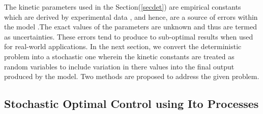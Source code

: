 \documentclass[3p,times,authoryear]{elsarticle}
\begin{document}
The kinetic parameters used in the Section(\ref{secdet}) are empirical constants which are derived by experimental data \cite{hu,shi,paeng}, and hence, are a source of errors within the model .The exact values of the parameters are unknown and thus are termed as uncertainties. These errors tend to produce to sub-optimal results when used for real-world applications. In the next section, we convert the deterministic problem into a stochastic one wherein the kinetic constants are treated as random variables to include variation in there values into the final output produced by the model. Two methods are proposed to address the given problem. 

\subsection{Stochastic Optimal Control using Ito Processes}
\end{document}
